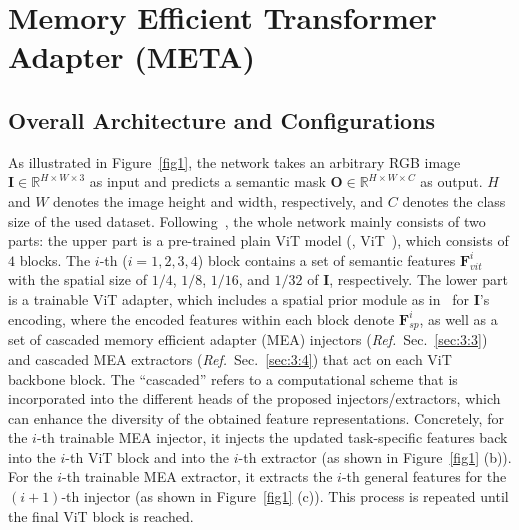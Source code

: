 \section{Memory Efficient Transformer Adapter (META)}

\subsection{Overall Architecture and Configurations}
As illustrated in Figure~\ref{fig1}, the network takes an arbitrary RGB image $\textbf{I} \in \mathbb{R}^{H \times W \times 3}$ as input and predicts a semantic mask $\textbf{O} \in \mathbb{R}^{H \times W \times C}$ as output. $H$ and $W$ denotes the image height and width, respectively, and $C$ denotes the class size of the used dataset.
%
Following~\citep{jie2023fact,li2022exploring,chen2022vision}, the whole network mainly consists of two parts: the upper part is a pre-trained plain ViT model (\eg, ViT~\citep{li2021benchmarking}), which consists of $4$ blocks. The $i$-th ($i = 1, 2, 3, 4$) block contains a set of semantic features $\textbf{F}^i_{vit}$ with the spatial size of $1/4$, $1/8$, $1/16$, and $1/32$ of $\textbf{I}$, respectively. 
%
The lower part is a trainable ViT adapter, which includes a spatial prior module as in~\citep{chen2022vision} for $\textbf{I}$'s encoding, where the encoded features within each block denote $\textbf{F}^i_{sp}$, as well as a set of cascaded memory efficient adapter (MEA) injectors (\emph{Ref.}~Sec.~\ref{sec:3:3}) and cascaded MEA extractors (\emph{Ref.}~Sec.~\ref{sec:3:4}) that act on each ViT backbone block. 
%
%
The ``cascaded'' refers to a computational scheme that is incorporated into the different heads of the proposed injectors/extractors, which can enhance the diversity of the obtained feature representations.
%
%
Concretely, for the $i$-th trainable MEA injector, it injects the updated task-specific features back into the $i$-th ViT block and into the $i$-th extractor (as shown in Figure~\ref{fig1} (b)). For the $i$-th trainable MEA extractor, it extracts the $i$-th general features for the $(i+1)$-th injector (as shown in Figure~\ref{fig1} (c)). This process is repeated until the final ViT block is reached. 

